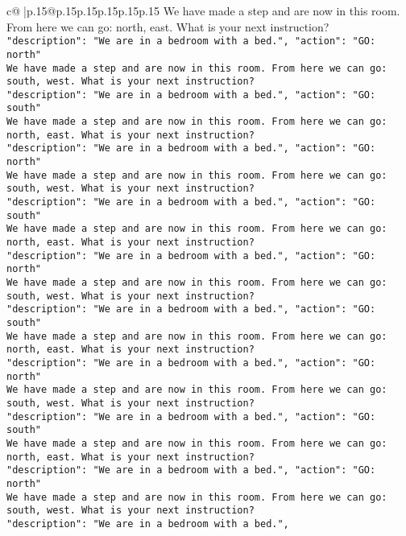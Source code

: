 \documentclass{article}
\begin{document}
{\begin{supertabular}{c@{$\;$}|p{.15\linewidth}@{}p{.15\linewidth}p{.15\linewidth}p{.15\linewidth}p{.15\linewidth}p{.15\linewidth}}
{{{We have made a step and are now in this room. From here we can go: north, east. What is your next instruction?\\ \tt {"description": "We are in a bedroom with a bed.", "action": "GO: north"}\\ \tt We have made a step and are now in this room. From here we can go: south, west. What is your next instruction?\\ \tt {"description": "We are in a bedroom with a bed.", "action": "GO: south"}\\ \tt We have made a step and are now in this room. From here we can go: north, east. What is your next instruction?\\ \tt {"description": "We are in a bedroom with a bed.", "action": "GO: north"}\\ \tt We have made a step and are now in this room. From here we can go: south, west. What is your next instruction?\\ \tt {"description": "We are in a bedroom with a bed.", "action": "GO: south"}\\ \tt We have made a step and are now in this room. From here we can go: north, east. What is your next instruction?\\ \tt {"description": "We are in a bedroom with a bed.", "action": "GO: north"}\\ \tt We have made a step and are now in this room. From here we can go: south, west. What is your next instruction?\\ \tt {"description": "We are in a bedroom with a bed.", "action": "GO: south"}\\ \tt We have made a step and are now in this room. From here we can go: north, east. What is your next instruction?\\ \tt {"description": "We are in a bedroom with a bed.", "action": "GO: north"}\\ \tt We have made a step and are now in this room. From here we can go: south, west. What is your next instruction?\\ \tt {"description": "We are in a bedroom with a bed.", "action": "GO: south"}\\ \tt We have made a step and are now in this room. From here we can go: north, east. What is your next instruction?\\ \tt {"description": "We are in a bedroom with a bed.", "action": "GO: north"}\\ \tt We have made a step and are now in this room. From here we can go: south, west. What is your next instruction?\\ \tt {"description": "We are in a bedroom with a bed.", 
	  } 
	   } 
	   } 
	  \\ 
 

}
\end{supertabular}}
\end{document}
